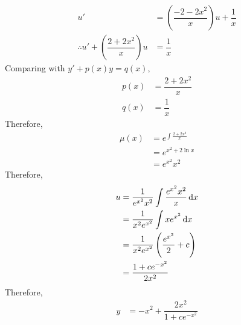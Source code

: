 \documentclass[fleqn, a4paper, 12pt, oneside]{amsart}
\theoremstyle{definition}
\theoremstyle{theorem}
\begin{document}
\begin{solution}
\begin{enumerate}[leftmargin=*]
\begin{align*}
				u' &= \left( \dfrac{-2 - 2 x^2}{x} \right) u + \dfrac{1}{x}\\
				\therefore u' + \left( \dfrac{2 + 2x^2}{x} \right) u &= \dfrac{1}{x}
			\end{align*}
			Comparing with $y' + p(x) y = q(x)$,
			\begin{align*}
				p(x) &= \dfrac{2 + 2 x^2}{x}\\
				q(x) &= \dfrac{1}{x}
			\end{align*}
			Therefore,
			\begin{align*}
				\mu(x) &= e^{\int \frac{2 + 2 x^2}{x}}\\
				&= e^{x^2 + 2 \ln x}\\
				&= e^{x^2} x^2
			\end{align*}
			Therefore,
			\begin{align*}
				u &= \dfrac{1}{e^{x^2} x^2} \int \dfrac{e^{x^2} x^2}{x} \dif x\\
				&= \dfrac{1}{x^2 e^{x^2}} \int x e^{x^2} \dif x\\
				&= \dfrac{1}{x^2 e^{x^2}} \left( \dfrac{e^{x^2}}{2} + c \right)\\
				&= \dfrac{1 + c e^{-x^2}}{2 x^2}
			\end{align*}
			Therefore,
			\begin{align*}
				y &= -x^2 + \dfrac{2 x^2}{1 + c e^{-x^2}}\\
			\end{align*}
	\end{enumerate}
\end{solution}
\end{document}
